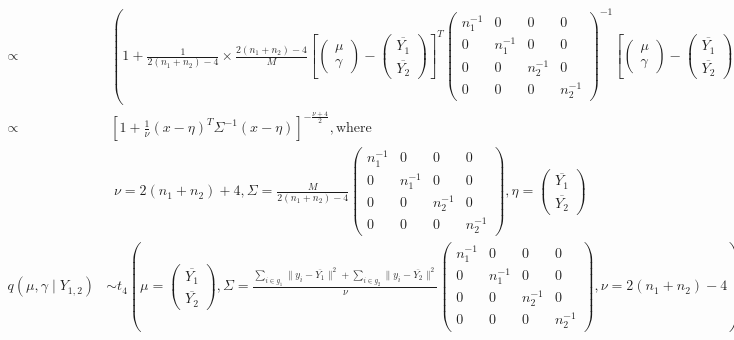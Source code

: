 \documentclass{article}
\begin{document}
\begin{align*}
  \propto&\; \left(1 + \frac{1}{2(n_1 + n_2) - 4}\times\frac{2(n_1 + n_2) - 4}{M}\left[\left(\begin{matrix}\mu\\ \gamma\end{matrix}\right) - \left(\begin{matrix*}\overline{Y_1}\\ \overline{Y_2}\end{matrix*}\right)\right]^T \left(\begin{matrix*} n_1^{-1} & 0 & 0 & 0 \\ 0 & n_1^{-1} & 0 & 0 \\ 0 & 0 & n_2^{-1} & 0 \\ 0 & 0 & 0 & n_2^{-1} \end{matrix*}\right)^{-1} \left[\left(\begin{matrix}\mu\\ \gamma\end{matrix}\right) - \left(\begin{matrix*}\overline{Y_1}\\ \overline{Y_2}\end{matrix*}\right)\right]\right)^{-(n_1 + n_2)}\\
  \propto&\; \left[1 + \frac{1}{\nu}(x - \eta)^T\Sigma^{-1}(x - \eta)\right]^{-\frac{\nu + 4}{2}}, \textrm{where }\\
  &\;\; \nu=2(n_1 + n_2) + 4, \Sigma=\frac{M}{2(n_1 + n_2) - 4}\left(\begin{matrix*} n_1^{-1} & 0 & 0 & 0 \\ 0 & n_1^{-1} & 0 & 0 \\ 0 & 0 & n_2^{-1} & 0 \\ 0 & 0 & 0 & n_2^{-1} \end{matrix*}\right), \eta=\left(\begin{matrix*}\overline{Y_1}\\ \overline{Y_2}\end{matrix*}\right)\\
  q(\mu, \gamma \mid Y_{1,2}) &\sim t_4\left(\mu= \left(\begin{matrix*}
    \overline{Y_1}\\ \overline{Y_2} \end{matrix*}\right), \Sigma=\frac{\sum_{i\in g_1}\lVert y_i - \overline{Y_1} \rVert^2 + \sum_{i \in g_2}\lVert y_i - \overline{Y_2}\rVert^2}{\nu}\left(\begin{matrix*}
      n_1^{-1} & 0 & 0 & 0 \\ 0 & n_1^{-1} & 0 & 0 \\ 0 & 0 & n_2^{-1} & 0 \\ 0 & 0 & 0 & n_2^{-1}
    \end{matrix*}\right), \nu=2(n_1 + n_2) - 4 \right)
\end{align*}
\end{document}
